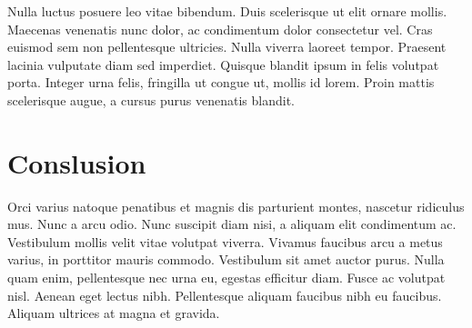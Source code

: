 \documentclass[12pt]{article}
\begin{document}
\begin{multicols*}{2}
Nulla luctus posuere leo vitae bibendum. Duis scelerisque ut elit ornare mollis. Maecenas venenatis nunc dolor, ac condimentum dolor consectetur vel. Cras euismod sem non pellentesque ultricies. Nulla viverra laoreet tempor. Praesent lacinia vulputate diam sed imperdiet. Quisque blandit ipsum in felis volutpat porta. Integer urna felis, fringilla ut congue ut, mollis id lorem. Proin mattis scelerisque augue, a cursus purus venenatis blandit.

\section{Conslusion} \label{finance}
Orci varius natoque penatibus et magnis dis parturient montes, nascetur ridiculus mus. Nunc a arcu odio. Nunc suscipit diam nisi, a aliquam elit condimentum ac. Vestibulum mollis velit vitae volutpat viverra. Vivamus faucibus arcu a metus varius, in porttitor mauris commodo. Vestibulum sit amet auctor purus. Nulla quam enim, pellentesque nec urna eu, egestas efficitur diam. Fusce ac volutpat nisl. Aenean eget lectus nibh. Pellentesque aliquam faucibus nibh eu faucibus. Aliquam ultrices at magna et gravida.

\end{multicols*}
\end{document}
